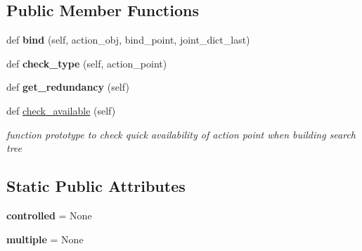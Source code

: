 \subsection*{Public Member Functions}
\begin{DoxyCompactItemize}
\item 
\mbox{\label{classrnb-planning_1_1src_1_1pkg_1_1planning_1_1constraint_1_1constraint__action_1_1_binding_a8052fb0ef3ad6e8baa8e5059356076c2}} 
def {\bfseries bind} (self, action\+\_\+obj, bind\+\_\+point, joint\+\_\+dict\+\_\+last)
\item 
\mbox{\label{classrnb-planning_1_1src_1_1pkg_1_1planning_1_1constraint_1_1constraint__action_1_1_binding_a0718f864a7d69ff307b351d48c33d47b}} 
def {\bfseries check\+\_\+type} (self, action\+\_\+point)
\item 
\mbox{\label{classrnb-planning_1_1src_1_1pkg_1_1planning_1_1constraint_1_1constraint__action_1_1_binding_ae1eac01e53390eabd9097503612bd47c}} 
def {\bfseries get\+\_\+redundancy} (self)
\item 
\mbox{\label{classrnb-planning_1_1src_1_1pkg_1_1planning_1_1constraint_1_1constraint__action_1_1_binding_a5e5c8fd2929c390f97d14057c5f4e11a}} 
def \hyperlink{classrnb-planning_1_1src_1_1pkg_1_1planning_1_1constraint_1_1constraint__action_1_1_binding_a5e5c8fd2929c390f97d14057c5f4e11a}{check\+\_\+available} (self)
\begin{DoxyCompactList}\small\item\em function prototype to check quick availability of action point when building search tree \end{DoxyCompactList}\end{DoxyCompactItemize}
\subsection*{Static Public Attributes}
\begin{DoxyCompactItemize}
\item 
\mbox{\label{classrnb-planning_1_1src_1_1pkg_1_1planning_1_1constraint_1_1constraint__action_1_1_binding_a7c1f4ab153515a882dd1e96d2fd2e7fe}} 
{\bfseries controlled} = None
\item 
\mbox{\label{classrnb-planning_1_1src_1_1pkg_1_1planning_1_1constraint_1_1constraint__action_1_1_binding_a323efcde4bb6420dc5eab0fab0b9b47e}} 
{\bfseries multiple} = None
\end{DoxyCompactItemize}
